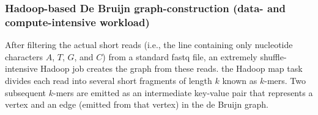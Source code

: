 \documentclass[conference]{IEEEtran}
\begin{document}
\subsubsection {Hadoop-based De Bruijn graph-construction (data- and compute-intensive workload)}
After filtering the actual short reads (i.e., the line containing only nucleotide characters $A$, $T$, $G$, and $C$) from a standard fastq file, an extremely shuffle-intensive Hadoop job creates the graph from these reads.  the Hadoop map task divides each read into several short fragments of length $k$ known as $k$-mers. 
Two subsequent $k$-mers are emitted as an intermediate key-value pair that represents  a vertex and an edge (emitted from that vertex) in the de Bruijn graph.  
\end{document}
